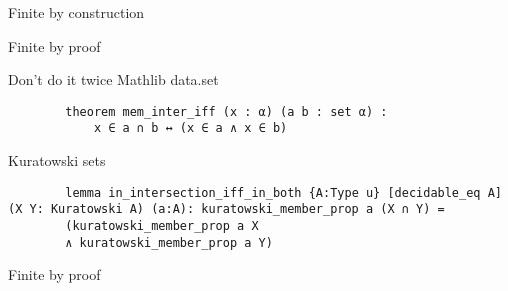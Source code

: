 \documentclass{beamer}
\begin{document}
    \begin{frame}{Finite by construction}
        
    \end{frame}
    \begin{frame}{Finite by proof}
        
    \end{frame}
    \begin{frame}[fragile]{Don't do it twice}
        Mathlib data.set
        \begin{lstlisting}
        theorem mem_inter_iff (x : α) (a b : set α) :
            x ∈ a ∩ b ↔ (x ∈ a ∧ x ∈ b)
        \end{lstlisting}
        Kuratowski sets
        \begin{lstlisting}
        lemma in_intersection_iff_in_both {A:Type u} [decidable_eq A] (X Y: Kuratowski A) (a:A): kuratowski_member_prop a (X ∩ Y) = 
        (kuratowski_member_prop a X 
        ∧ kuratowski_member_prop a Y)
        \end{lstlisting}

    \end{frame}
    \begin{frame}{Finite by proof}
        
    \end{frame}
\end{document}
